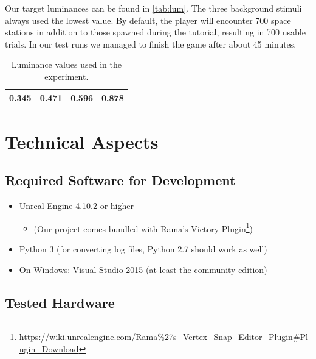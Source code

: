\documentclass[11pt,a4paper]{article}
\begin{document}
            Our target luminances can be found in \autoref{tab:lum}. The three background stimuli always used the lowest value. By default, the player will encounter 700 space stations in addition to those spawned during the tutorial, resulting in 700 usable trials. In our test runs we managed to finish the game after about 45 minutes.
            
            \begin{table}[h!tbp]
            	\centering
                \begin{tabular}{|l|l|l|l|} \hline
                	0.345 & 0.471 & 0.596 & 0.878 \\ \hline
                \end{tabular}
                \caption{Luminance values used in the experiment.}
                \label{tab:lum}
            \end{table}  
        
    
    \section{Technical Aspects}
    
        \subsection{Required Software for Development}
    
    	    \begin{itemize}
        	    \item Unreal Engine 4.10.2 or higher
                \begin{itemize}
                    \item (Our project comes bundled with Rama's Victory Plugin\footnote{\href{https://wiki.unrealengine.com/Rama\%27s\_Vertex\_Snap\_Editor\_Plugin\#Plugin\_Download}{https://wiki.unrealengine.com/Rama\%27s\_Vertex\_Snap\_Editor\_Plugin\#Plugin\_Download}})
                \end{itemize}
                \item Python 3 (for converting log files, Python 2.7 should work as well)
                \item On Windows: Visual Studio 2015 (at least the community edition) 
            \end{itemize}
        
        \subsection{Tested Hardware}
        
\end{document}
